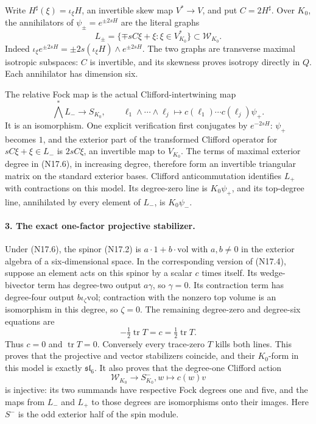 Write $H^\sharp(\xi)=\iota_\xi H$, an invertible skew map
$V^*\to V$, and put $C=2H^\sharp$. Over $K_0$, the annihilators
of $\psi_\pm=e^{\pm2sH}$ are the literal graphs
\begin{equation}
 L_\pm=\{\mp sC\xi+\xi:\xi\in V^*_{K_0}\}
                          \subset\mathcal W_{K_0}.    \tag{N17.5}
\end{equation}
Indeed $\iota_\xi e^{\pm2sH}
=\pm2s(\iota_\xi H)\wedge e^{\pm2sH}$.
The two graphs are transverse maximal isotropic subspaces:
$C$ is invertible, and its skewness proves isotropy directly
in $Q$. Each annihilator has dimension six.

The relative Fock map is the actual Clifford-intertwining map
\begin{equation}
 \bigwedge^*L_-\longrightarrow S_{K_0},\qquad
 \ell_1\wedge\cdots\wedge\ell_j\longmapsto
                 c(\ell_1)\cdots c(\ell_j)\psi_+.    \tag{N17.6}
\end{equation}
It is an isomorphism. One explicit verification first conjugates
by $e^{-2sH}$: $\psi_+$ becomes $1$, and the exterior part of
the transformed Clifford operator for
$sC\xi+\xi\in L_-$ is $2sC\xi$, an invertible map to $V_{K_0}$.
The terms of maximal exterior degree in (N17.6), in increasing
degree, therefore form an invertible triangular matrix on the
standard exterior bases. Clifford anticommutation identifies
$L_+$ with contractions on this model. Its degree-zero line
is $K_0\psi_+$, and its top-degree line, annihilated by every
element of $L_-$, is $K_0\psi_-$.

\paragraph{3. The exact one-factor projective stabilizer.}
Under (N17.6), the spinor (N17.2) is
$a\cdot1+b\cdot\mathrm{vol}$ with $a,b\ne0$ in the exterior
algebra of a six-dimensional space. In the corresponding
version of (N17.4), suppose an element acts on this spinor
by a scalar $c$ times itself. Its wedge-bivector term has
degree-two output $a\gamma$, so $\gamma=0$. Its contraction
term has degree-four output $b\iota_\zeta\mathrm{vol}$;
contraction with the nonzero top volume is an isomorphism
in this degree, so $\zeta=0$. The remaining degree-zero
and degree-six equations are
\[
       -\tfrac12\operatorname{tr}T=c
                       =\tfrac12\operatorname{tr}T.
\]
Thus $c=0$ and $\operatorname{tr}T=0$. Conversely every
trace-zero $T$ kills both lines. This proves that the
projective and vector stabilizers coincide, and their
$K_0$-form in this model is exactly $\mathfrak{sl}_6$.
It also proves that the degree-one Clifford action
\begin{equation}
          \mathcal W_{K_0}\longrightarrow S^-_{K_0},
                     w\longmapsto c(w)v              \tag{N17.7}
\end{equation}
is injective: its two summands have respective Fock degrees
one and five, and the maps from $L_-$ and $L_+$ to those
degrees are isomorphisms onto their images. Here $S^-$ is
the odd exterior half of the spin module.

